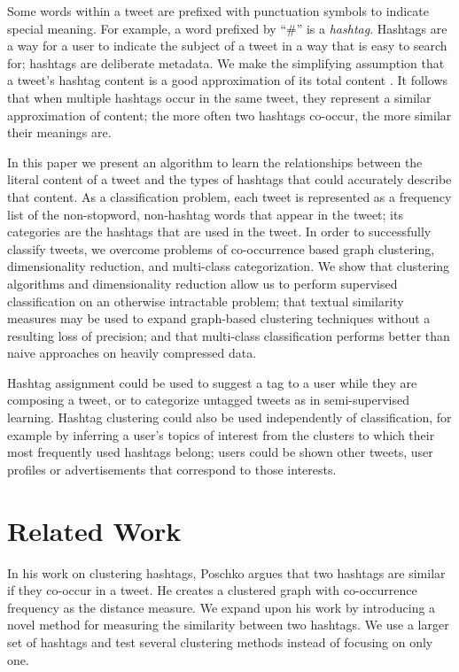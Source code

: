 Some words within a tweet are prefixed with punctuation symbols to indicate special meaning. For example, a word prefixed by ``$\#$'' is a {\it hashtag}. Hashtags are a way for a user to indicate the subject of a tweet in a way that is easy to search for; hashtags are deliberate metadata. We make the simplifying assumption that a tweet's hashtag content is a good approximation of its total content \cite{Rosa2011}. It follows that when multiple hashtags occur in the same tweet, they represent a similar approximation of content; the more often two hashtags co-occur, the more similar their meanings are.

In this paper we present an algorithm to learn the relationships between the literal content of a tweet and the types of hashtags that could accurately describe that content. As a classification problem, each tweet is represented as a frequency list of the non-stopword, non-hashtag words that appear in the tweet; its categories are the hashtags that are used in the tweet. In order to successfully classify tweets, we overcome problems of co-occurrence based graph clustering, dimensionality reduction, and multi-class categorization. We show that clustering algorithms and dimensionality reduction allow us to perform supervised classification on an otherwise intractable problem; that textual similarity measures may be used to expand graph-based clustering techniques without a resulting loss of precision; and that multi-class classification performs better than naive approaches on heavily compressed data.

Hashtag assignment could be used to suggest a tag to a user while they are composing a tweet, or to categorize untagged tweets as in semi-supervised learning. Hashtag clustering could also be used independently of classification, for example by inferring a user's topics of interest from the clusters to which their most frequently used hashtags belong; users could be shown other tweets, user profiles or advertisements that correspond to those interests.

\section{Related Work}
In his work on clustering hashtags, Poschko argues that two hashtags are similar if they co-occur in a tweet\cite{Poschko2011}. He creates a clustered graph with co-occurrence frequency as the distance measure. We expand upon his work by introducing a novel method for measuring the similarity between two hashtags. We use a larger set of hashtags and test several clustering methods instead of focusing on only one. 

